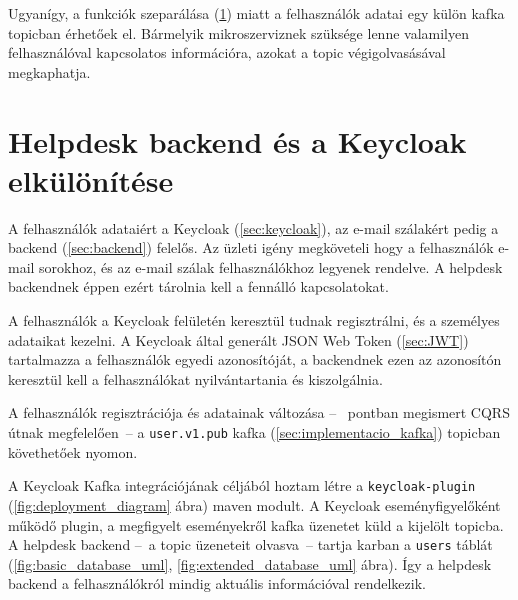 Ugyanígy, a funkciók szeparálása (\ref{sec:backend_keycloak_separation}) miatt a felhasználók adatai egy külön kafka topicban érhetőek el. Bármelyik mikroszerviznek szüksége lenne valamilyen felhasználóval kapcsolatos információra, azokat a topic végigolvasásával megkaphatja.



\section{Helpdesk backend és a Keycloak elkülönítése}\label{sec:backend_keycloak_separation}
A felhasználók adataiért a Keycloak (\ref{sec:keycloak}), az e-mail szálakért pedig a backend (\ref{sec:backend}) felelős. Az üzleti igény megköveteli hogy a felhasználók e-mail sorokhoz, és az e-mail szálak felhasználókhoz legyenek rendelve. A helpdesk backendnek éppen ezért tárolnia kell a fennálló kapcsolatokat.

A felhasználók a Keycloak felületén keresztül tudnak regisztrálni, és a személyes adataikat kezelni. A Keycloak által generált JSON Web Token (\ref{sec:JWT}) tartalmazza a felhasználók egyedi azonosítóját, a backendnek ezen az azonosítón keresztül kell a felhasználókat nyilvántartania és kiszolgálnia.

A felhasználók regisztrációja és adatainak változása --~ pontban megismert CQRS útnak megfelelően~-- a \texttt{user.v1.pub} kafka (\ref{sec:implementacio_kafka}) topicban követhetőek nyomon.

A Keycloak Kafka integrációjának céljából hoztam létre a \texttt{keycloak-plugin} (\ref{fig:deployment_diagram} ábra) maven modult. A Keycloak eseményfigyelőként működő plugin, a megfigyelt eseményekről kafka üzenetet küld a kijelölt topicba. A helpdesk backend --~a topic üzeneteit olvasva~-- tartja karban a \texttt{users} táblát (\ref{fig:basic_database_uml}, \ref{fig:extended_database_uml} ábra). Így a helpdesk backend a felhasználókról mindig aktuális információval rendelkezik.

